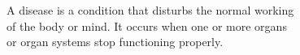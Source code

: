 \documentclass[preview]{standalone}
\begin{document}
\begin{center}
A disease is a condition that disturbs the normal working\\of the body or mind. It occurs when one or more organs\\or organ systems stop functioning properly.
\end{center}
\end{document}
